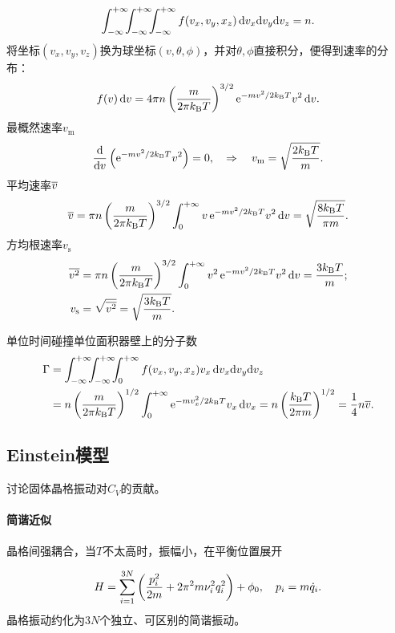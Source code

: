\[
	\int\iti\bs5\int\iti\bs5\int\iti f(v_x,v_y,x_z)\d v_x\nd v_y\nd v_z=n.
\]
将坐标$(v_x,v_y,v_z)$换为球坐标$(v,\theta,\phi)$，并对$\theta,\phi$直接积分，便得到速率的分布：
\begin{align}
	f(v)\d v=4\pi n\kh{\frac m{2\pi\kB T}}^{3/2}\e{-mv^2/2\kB T}v^2\d v.
\end{align}
最概然速率$v_\mathrm m$
\begin{gather}
	\dd v\kh{\e{-mv^2/2\kB T}v^2}=0,\thus
	v_\mathrm m=\sqrt{\frac{2\kB T}m}.
\end{gather}
平均速率$\avg v$
\begin{align}
	\avg v=\pi n\kh{\frac m{2\pi\kB T}}^{3/2}\int\zti v\e{-mv^2/2\kB T}v^2\d v=\sqrt{\frac{8\kB T}{\pi m}}.
\end{align}
方均根速率$v_\mathrm s$
\begin{align}\notag
	\avg{v^2}&=\pi n\kh{\frac m{2\pi\kB T}}^{3/2}\int\zti v^2\e{-mv^2/2\kB T}v^2\d v=\frac{3\kB T}m;\\
	v_\mathrm s&=\sqrt{\avg{v^2}}=\sqrt{\frac{3\kB T}m}.
\end{align}

单位时间碰撞单位面积器壁上的分子数
\begin{align}\notag
	\Gamma&=\int\iti\bs5\int\iti\bs5\int\zti f(v_x,v_y,x_z) v_x\d v_x\nd v_y\nd v_z\\
	&=n\kh{\frac m{2\pi\kB T}}^{1/2}\int\zti\e{-mv_x^2/2\kB T}v_x\d v_x=n\kh{\frac{\kB T}{2\pi m}}^{1/2}=\frac14n\avg v.
\end{align}
\subsection{Einstein模型}
讨论固体晶格振动对$C_V$的贡献。
\paragraph*{简谐近似}
晶格间强耦合，当$T$不太高时，振幅小，在平衡位置展开
\iffalse
	\[
	\varPhi(x_1,x_2,\ldots,x_{3N})=\edg\phi_{x_i=0}+\sum\edg{\pv\phi{x_i}}_{x_i=0}x_i+\frac12\sum\edg{\pw\phi{x_i}{x_j}}_{x_j=0}x_ix_j+\cdots
\]
	保留至二次项
	\[
	H=\sum\frac12\dot x_i^2+\sum\frac12C_{ij}x_ix_j+\phi_0,\quad C_{ij}:=\edg{\pw\phi{x_i}{x_j}}_{x_j=0}.
\]
	使用正交变换使其对角化
	\begin{align*}
		xCx\tp=q\Lambda q\tp.
	\end{align*}
\fi
\[
	H=\sum_{i=1}^{3N}\kh{\frac{p_i^2}{2m}+2\pi^2m\nu_i^2q_i^2}+\phi_0,\quad p_i=m\dot q_i.
\]
晶格振动约化为$3N$个独立、可区别的简谐振动。
